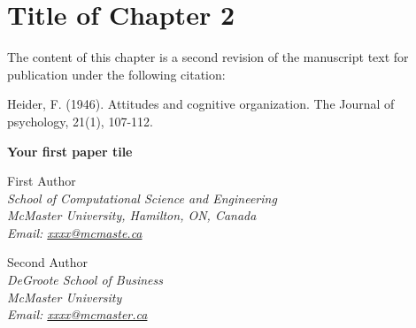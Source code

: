 \chapter{Title of Chapter 2}
\label{chapt2} 

\vspace{60pt}


The content of this chapter is a second revision of the manuscript text for publication under the following citation:\\

\begin{topbot}
Heider, F. (1946). Attitudes and cognitive organization. The Journal of psychology, 21(1), 107-112.
\end{topbot}

\newpage


\begin{center}
    \Large \textbf{Your first paper tile}
\end{center}

\vspace{40pt}

\begin{center}
First Author\\
\textit{School of Computational Science and Engineering}\\
\textit{McMaster University, Hamilton, ON, Canada}\\
\textit{Email: \href{mailto:xxxxx@mcmaste.ca}{xxxx@mcmaste.ca}}

\vspace{10pt}

Second Author\\
\textit{DeGroote School of Business}\\
\textit{McMaster University}\\
\textit{Email: \href{mailto:xxxx@mcmaster.ca}{xxxx@mcmaster.ca}}

\end{center}


\vspace{30pt}

